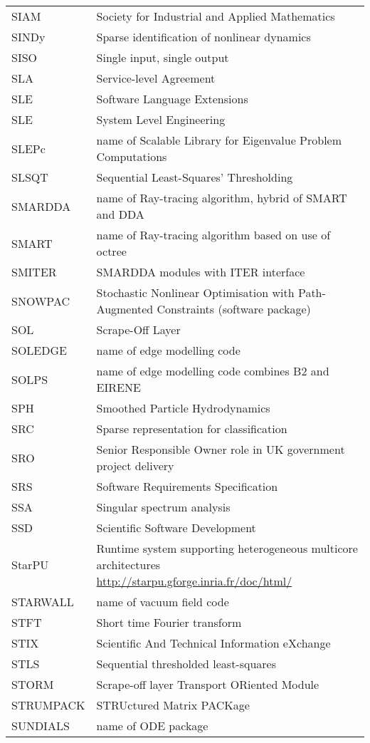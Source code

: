 \begin{longtable}{|p{4.0cm}|p{12.0cm}|}
SIAM & Society for Industrial and Applied Mathematics \\
SINDy  & Sparse identification of nonlinear dynamics \\
SISO  & Single input, single output \\
SLA & Service-level Agreement \\
SLE & Software Language Extensions \\
SLE & System Level Engineering \\
SLEPc & name of Scalable Library for Eigenvalue Problem Computations \\
SLSQT & Sequential Least-Squares' Thresholding \\
SMARDDA & name of Ray-tracing algorithm, hybrid of SMART and DDA \\
SMART & name of Ray-tracing algorithm based on use of octree\\
SMITER & SMARDDA modules with ITER interface \\
SNOWPAC & Stochastic Nonlinear Optimisation with Path-Augmented Constraints (software package) \\
SOL & Scrape-Off Layer \\
SOLEDGE & name of edge modelling code \\
SOLPS & name of edge modelling code combines B2 and EIRENE\\
SPH & Smoothed Particle Hydrodynamics \\
SRC  & Sparse representation for classification \\
SRO & Senior Responsible Owner role in UK  government project delivery \\
SRS & Software Requirements Specification \\
SSA  & Singular spectrum analysis \\
SSD & Scientific Software Development \\
StarPU & Runtime system supporting heterogeneous multicore architectures \url{http://starpu.gforge.inria.fr/doc/html/} \\
STARWALL & name of vacuum field code \\
STFT  & Short time Fourier transform \\
STIX & Scientific And Technical Information eXchange \\
STLS  & Sequential thresholded least-squares \\
STORM & Scrape-off layer Transport ORiented Module \\
STRUMPACK & STRUctured Matrix PACKage \\
SUNDIALS & name of ODE package \\

\end{longtable}
